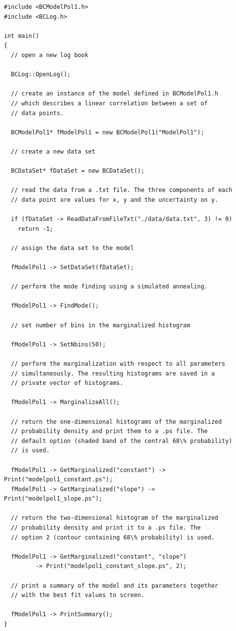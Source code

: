 \documentclass[11pt, a4paper]{article}
\begin{document}
\begin{small} 
\begin{verbatim}
#include <BCModelPol1.h>
#include <BCLog.h> 

int main()
{
  // open a new log book 

  BCLog::OpenLog(); 

  // create an instance of the model defined in BCModelPol1.h 
  // which describes a linear correlation between a set of 
  // data points. 

  BCModelPol1* fModelPol1 = new BCModelPol1("ModelPol1"); 

  // create a new data set 

  BCDataSet* fDataSet = new BCDataSet(); 

  // read the data from a .txt file. The three components of each 
  // data point are values for x, y and the uncertainty on y. 

  if (fDataSet -> ReadDataFromFileTxt("./data/data.txt", 3) != 0)
    return -1; 

  // assign the data set to the model 

  fModelPol1 -> SetDataSet(fDataSet); 

  // perform the mode finding using a simulated annealing. 

  fModelPol1 -> FindMode(); 

  // set number of bins in the marginalized histogram 

  fModelPol1 -> SetNbins(50);

  // perform the marginalization with respect to all parameters 
  // simultaneously. The resulting histograms are saved in a 
  // private vector of histograms. 

  fModelPol1 -> MarginalizeAll();

  // return the one-dimensional histograms of the marginalized 
  // probability density and print them to a .ps file. The 
  // default option (shaded band of the central 68\% probability) 
  // is used. 

  fModelPol1 -> GetMarginalized("constant") -> Print("modelpol1_constant.ps");
  fModelPol1 -> GetMarginalized("slope") -> Print("modelpol1_slope.ps");

  // return the two-dimensional histogram of the marginalized 
  // probability density and print it to a .ps file. The 
  // option 2 (contour containing 68\% probability) is used. 

  fModelPol1 -> GetMarginalized("constant", "slope") 
	     -> Print("modelpol1_constant_slope.ps", 2);

  // print a summary of the model and its parameters together 
  // with the best fit values to screen. 

  fModelPol1 -> PrintSummary(); 
} 
\end{verbatim} 
\end{small} 
\end{document}
